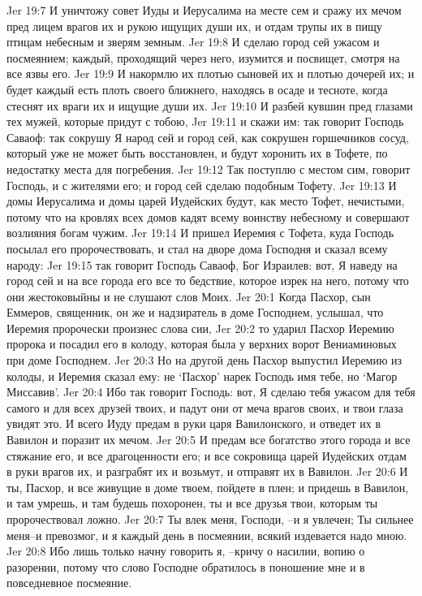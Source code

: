 Jer 19:7  И уничтожу совет Иуды и Иерусалима на месте сем и сражу их мечом пред лицем врагов их и рукою ищущих души их, и отдам трупы их в пищу птицам небесным и зверям земным.
Jer 19:8  И сделаю город сей ужасом и посмеянием; каждый, проходящий через него, изумится и посвищет, смотря на все язвы его.
Jer 19:9  И накормлю их плотью сыновей их и плотью дочерей их; и будет каждый есть плоть своего ближнего, находясь в осаде и тесноте, когда стеснят их враги их и ищущие души их.
Jer 19:10  И разбей кувшин пред глазами тех мужей, которые придут с тобою,
Jer 19:11  и скажи им: так говорит Господь Саваоф: так сокрушу Я народ сей и город сей, как сокрушен горшечников сосуд, который уже не может быть восстановлен, и будут хоронить их в Тофете, по недостатку места для погребения.
Jer 19:12  Так поступлю с местом сим, говорит Господь, и с жителями его; и город сей сделаю подобным Тофету.
Jer 19:13  И домы Иерусалима и домы царей Иудейских будут, как место Тофет, нечистыми, потому что на кровлях всех домов кадят всему воинству небесному и совершают возлияния богам чужим.
Jer 19:14  И пришел Иеремия с Тофета, куда Господь посылал его пророчествовать, и стал на дворе дома Господня и сказал всему народу:
Jer 19:15  так говорит Господь Саваоф, Бог Израилев: вот, Я наведу на город сей и на все города его все то бедствие, которое изрек на него, потому что они жестоковыйны и не слушают слов Моих.
Jer 20:1  Когда Пасхор, сын Еммеров, священник, он же и надзиратель в доме Господнем, услышал, что Иеремия пророчески произнес слова сии,
Jer 20:2  то ударил Пасхор Иеремию пророка и посадил его в колоду, которая была у верхних ворот Вениаминовых при доме Господнем.
Jer 20:3  Но на другой день Пасхор выпустил Иеремию из колоды, и Иеремия сказал ему: не `Пасхор' нарек Господь имя тебе, но `Магор Миссавив'.
Jer 20:4  Ибо так говорит Господь: вот, Я сделаю тебя ужасом для тебя самого и для всех друзей твоих, и падут они от меча врагов своих, и твои глаза увидят это. И всего Иуду предам в руки царя Вавилонского, и отведет их в Вавилон и поразит их мечом.
Jer 20:5  И предам все богатство этого города и все стяжание его, и все драгоценности его; и все сокровища царей Иудейских отдам в руки врагов их, и разграбят их и возьмут, и отправят их в Вавилон.
Jer 20:6  И ты, Пасхор, и все живущие в доме твоем, пойдете в плен; и придешь в Вавилон, и там умрешь, и там будешь похоронен, ты и все друзья твои, которым ты пророчествовал ложно.
Jer 20:7  Ты влек меня, Господи, --и я увлечен; Ты сильнее меня--и превозмог, и я каждый день в посмеянии, всякий издевается надо мною.
Jer 20:8  Ибо лишь только начну говорить я, --кричу о насилии, вопию о разорении, потому что слово Господне обратилось в поношение мне и в повседневное посмеяние.
